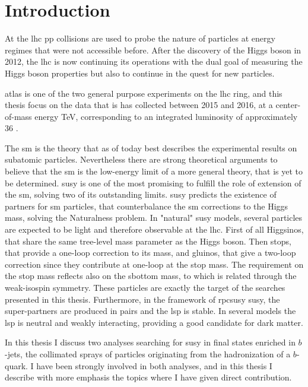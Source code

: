 \chapter*{Introduction}

At the \gls{lhc} \gls{pp} collisions are used to probe the nature of particles at energy regimes that were not accessible before. 
After the discovery of the Higgs boson in 2012, the \gls{lhc} is now continuing its operations with the dual goal 
of measuring the Higgs boson properties but also to continue in the quest for new particles.

\gls{atlas} is one of the two general purpose experiments on the \gls{lhc} ring, and this thesis focus on the data that is has collected between 
2015 and 2016, 
at a center-of-mass energy \cmtre TeV, corresponding to an 
integrated luminosity of approximately 36 \ifb. 

The \gls{sm} is the theory that as of today best describes the experimental results on subatomic particles. 
Nevertheless there are strong theoretical arguments to believe that the \gls{sm} is the low-energy limit 
of a more general theory, that is yet to be determined. 
\gls{susy} is one of the most promising to fulfill the role of extension of the \gls{sm}, 
solving two of its outstanding limits. \gls{susy} predicts the existence of partners for  
\gls{sm} particles, that counterbalance the \gls{sm} corrections to the Higgs mass, solving the Naturalness problem. 
In "natural" \gls{susy} models, several particles are expected to be light and therefore observable at the \gls{lhc}.
First of all Higgsinos, that share the same tree-level mass parameter as the Higgs boson. 
Then stops, that provide a one-loop correction to its mass, and gluinos, that give a two-loop correction since they contribute 
at one-loop at the stop mass. 
The requirement on the stop mass reflects also on the sbottom mass, to which is related through the weak-isospin symmetry. 
These particles are exactly the target of the searches presented in this thesis.
Furthermore, in the framework of \gls{rpcsusy} \gls{susy}, the super-partners are produced in pairs and the 
\gls{lsp} is stable. 
In several models the \gls{lsp} is neutral and weakly interacting, providing a good candidate for dark matter.
 

In this thesis I discuss two analyses searching for \gls{susy} in final states enriched in $b$-jets, the collimated sprays of 
particles originating from the hadronization of a $b$-quark. 
I have been strongly involved in both analyses, 
and in this thesis I describe with more emphasis the topics where I have given direct contribution.

